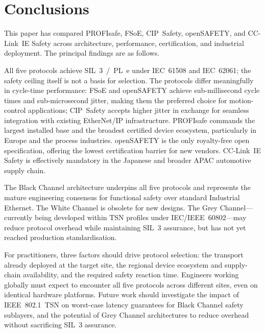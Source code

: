 \documentclass[conference]{IEEEtran}
\begin{document}
\section{Conclusions}

This paper has compared PROFIsafe, FSoE, CIP~Safety, openSAFETY, and
CC-Link~IE Safety across architecture, performance, certification, and
industrial deployment. The principal findings are as follows.

All five protocols achieve SIL~3~/~PL~e under IEC~61508 and IEC~62061;
the safety ceiling itself is not a basis for selection. The protocols
differ meaningfully in cycle-time performance: FSoE and openSAFETY achieve
sub-millisecond cycle times and sub-microsecond jitter, making them the
preferred choice for motion-control applications; CIP~Safety accepts higher
jitter in exchange for seamless integration with existing EtherNet/IP
infrastructure. PROFIsafe commands the largest installed base and the
broadest certified device ecosystem, particularly in Europe and the process
industries. openSAFETY is the only royalty-free open specification,
offering the lowest certification barrier for new vendors. CC-Link~IE
Safety is effectively mandatory in the Japanese and broader APAC automotive
supply chain.

The Black Channel architecture underpins all five protocols and represents
the mature engineering consensus for functional safety over standard
Industrial Ethernet. The White Channel is obsolete for new designs.
The Grey Channel---currently being developed within TSN profiles under
IEC/IEEE~60802---may reduce protocol overhead while maintaining SIL~3
assurance, but has not yet reached production standardisation.

For practitioners, three factors should drive protocol selection:
the transport already deployed at the target site, the regional device
ecosystem and supply-chain availability, and the required safety reaction
time. Engineers working globally must expect to encounter all five protocols
across different sites, even on identical hardware platforms. Future work
should investigate the impact of IEEE~802.1~TSN on worst-case latency
guarantees for Black Channel safety sublayers, and the potential of Grey
Channel architectures to reduce overhead without sacrificing SIL~3 assurance.



\end{document}
